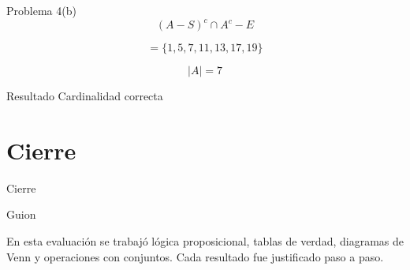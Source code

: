 \documentclass[aspectratio=169,10pt]{beamer}
\newcommand{\guion}[1]{
	\begin{block}{Guion}
		#1
	\end{block}
}
\newcommand{\resultado}[1]{
	\begin{alertblock}{Resultado}
		#1
	\end{alertblock}
}
\begin{document}
	\begin{frame}{Problema 4(b)}
		\[
		(A-S)^c\cap A^c - E
		\]
		
		\[
		= \{1,5,7,11,13,17,19\}
		\]
		
		\[
		|A|=7
		\]
		
		\resultado{Cardinalidad correcta}
	\end{frame}
	
	\section{Cierre}
	
	\begin{frame}{Cierre}
		\guion{
			En esta evaluación se trabajó lógica proposicional, tablas de verdad, diagramas de Venn y operaciones con conjuntos. Cada resultado fue justificado paso a paso.
		}
	\end{frame}
	
\end{document}
